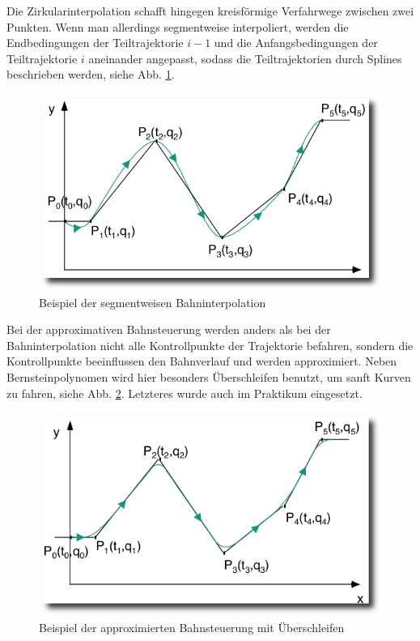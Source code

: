 Die Zirkularinterpolation schafft hingegen kreisförmige Verfahrwege zwischen zwei Punkten.
Wenn man allerdings segmentweise interpoliert, werden die Endbedingungen der Teiltrajektorie $i-1$ und die Anfangsbedingungen der Teiltrajektorie $i$ aneinander angepasst, sodass die Teiltrajektorien durch Splines beschrieben werden, siehe Abb. \ref{fig:segmentinterpolation}.
\begin{figure}[h]
	\center
	\includegraphics[scale=0.35]{graphics/segmentinterpolation.png}
	\caption{\label{fig:segmentinterpolation} Beispiel der segmentweisen Bahninterpolation \cite{rob1}}
\end{figure}
 
Bei der approximativen Bahnsteuerung werden anders als bei der Bahninterpolation nicht alle Kontrollpunkte der Trajektorie befahren, sondern die Kontrollpunkte beeinflussen den Bahnverlauf und werden approximiert.
Neben Bernsteinpolynomen wird hier besonders Überschleifen benutzt, um sanft Kurven zu fahren, siehe Abb. \ref{fig:ueberschleifeninterpolation}.
Letzteres wurde auch im Praktikum eingesetzt.
\begin{figure}[h]
	\center
	\includegraphics[scale=0.35]{graphics/ueberschleifeninterpolation.png}
	\caption{\label{fig:ueberschleifeninterpolation} Beispiel der approximierten Bahnsteuerung mit Überschleifen \cite{rob1}}
\end{figure}

